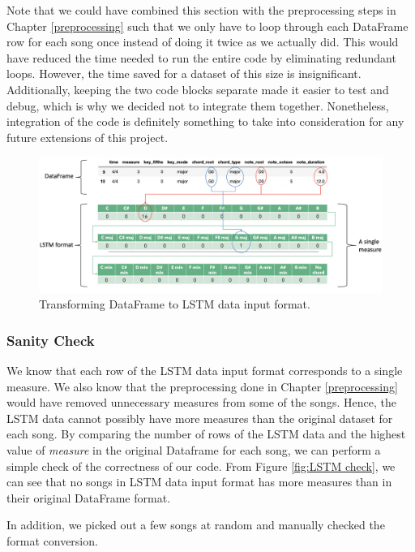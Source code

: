 Note that we could have combined this section with the preprocessing steps in Chapter \ref{preprocessing} such that we only have to loop through each DataFrame row for each song once instead of doing it twice as we actually did. This would have reduced the time needed to run the entire code by eliminating redundant loops. However, the time saved for a dataset of this size is insignificant. Additionally, keeping the two code blocks separate made it easier to test and debug, which is why we decided not to integrate them together. Nonetheless, integration of the code is definitely something to take into consideration for any future extensions of this project.
\begin{figure}
    \centering
    \includegraphics[scale=0.3]{Figures/LSTM pictorial 4}
    \decoRule
    \caption{Transforming DataFrame to LSTM data input format.}
    \label{fig:LSTM training}
    \end{figure}
    
\subsubsection{Sanity Check}
\label{lstm check}
We know that each row of the LSTM data input format corresponds to a single measure. We also know that the preprocessing done in Chapter \ref{preprocessing} would have removed unnecessary measures from some of the songs. Hence, the LSTM data cannot possibly have more measures than the original dataset for each song. By comparing the number of rows of the LSTM data and the highest value of \emph{measure} in the original Dataframe for each song, we can perform a simple check of the correctness of our code. From Figure \ref{fig:LSTM check}, we can see that no songs in LSTM data input format has more measures than in their original DataFrame format.

In addition, we picked out a few songs at random and manually checked the format conversion.

